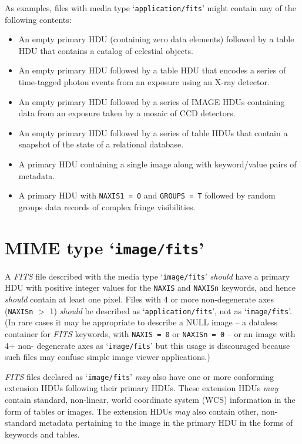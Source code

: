 \documentclass[11pt,makeidx]{book}     %
\begin{document}
  As examples, files with media type `{\tt application/fits}' might contain
  any of the following contents:
\begin{itemize}
\item
  An empty primary HDU (containing zero data elements) followed by a table
    HDU that contains a catalog of celestial objects.
\item
   An empty primary HDU followed by a table HDU that encodes a series of
    time-tagged photon events from an exposure using an X-ray detector.
\item
   An empty primary HDU followed by a series of IMAGE HDUs containing data
    from an exposure taken by a mosaic of CCD detectors.
\item
   An empty primary HDU followed by a series of table HDUs that contain a
    snapshot of the state of a relational database.
\item
  A primary HDU containing a single image along with keyword/value pairs of
    metadata.
\item
  A primary HDU with {\tt NAXIS1 = 0} and {\tt GROUPS = T} followed by random   
  groups data  records of complex fringe visibilities.
\end{itemize}

\section{MIME type `{\tt image/fits}'}

  A {\em FITS\/} file described with the media type `{\tt image/fits}' {\em should} have a
  primary HDU with positive integer values for the {\tt NAXIS} and {\tt NAXISn} keywords,
  and hence {\em should} contain at least one pixel.  Files with 4 or more
  non-degenerate axes ({\tt NAXISn} $>$ 1) {\em should} be described as
  `{\tt application/fits}', not as `{\tt image/fits}'.  (In rare cases it may be
  appropriate to describe a NULL image -- a dataless container for {\em FITS\/}   
  keywords, with {\tt NAXIS = 0} or {\tt NAXISn = 0} -- or an image with 4+ non-
  degenerate axes as `{\tt image/fits}' but this usage is discouraged because
  such files may confuse simple image viewer applications.)

  {\em FITS\/} files declared as `{\tt image/fits}' {\em may} also have one or more
  conforming extension HDUs following their primary HDUs.  These extension HDUs   {\em may}
  contain standard, non-linear, world coordinate system (WCS)
  information in the form of tables or images.  The extension HDUs {\em may}
  also contain other, non-standard metadata pertaining to the image in
  the primary HDU in the forms of keywords and tables.
\end{document}
